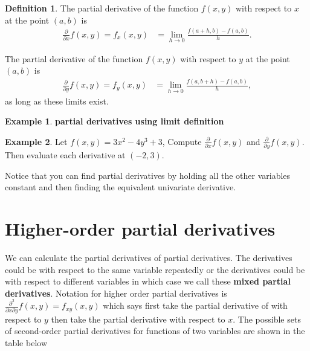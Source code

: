 \documentclass[
]{book}
\theoremstyle{definition}
\newtheorem{definition}{Definition}[chapter]
\theoremstyle{definition}
\newtheorem{example}{Example}[chapter]
\theoremstyle{definition}
\theoremstyle{definition}
\theoremstyle{remark}
\begin{document}
\begin{definition}
\protect\hypertarget{def:partial}{}\label{def:partial}The partial derivative of the function \(f(x, y)\) with respect to \(x\) at the point \((a, b)\) is
\[
\begin{aligned}
\frac{\partial}{\partial x} f(x, y) = f_x(x, y) & = \lim_{h \rightarrow 0} \frac{f(a + h, b) - f(a, b)} {h}.
\end{aligned}
\]

The partial derivative of the function \(f(x, y)\) with respect to \(y\) at the point \((a, b)\) is
\[
\begin{aligned}
\frac{\partial}{\partial y} f(x, y) = f_y(x, y) & = \lim_{h \rightarrow 0} \frac{f(a, b + h) - f(a, b)} {h},
\end{aligned}
\]
as long as these limits exist.
\end{definition}

\begin{example}
\textbf{partial derivatives using limit definition}
\end{example}

\begin{example}
Let \(f(x, y) = 3x^2 - 4 y^3 + 3\), Compute \(\frac{\partial}{\partial x}f(x, y)\) and \(\frac{\partial}{\partial y}f(x, y)\). Then evaluate each derivative at \((-2, 3)\).
\end{example}

Notice that you can find partial derivatives by holding all the other variables constant and then finding the equivalent univariate derivative.

\hypertarget{higher-order-partial-derivatives}{%
\section{Higher-order partial derivatives}\label{higher-order-partial-derivatives}}

We can calculate the partial derivatives of partial derivatives. The derivatives could be with respect to the same variable repeatedly or the derivatives could be with respect to different variables in which case we call these \textbf{mixed partial derivatives}. Notation for higher order partial derivatives is \(\frac{\partial^2}{\partial x \partial y} f(x, y) = f_{xy}(x, y)\) which says first take the partial derivative of with respect to \(y\) then take the partial derivative with respect to \(x\). The possible sets of second-order partial derivatives for functions of two variables are shown in the table below
\end{document}
